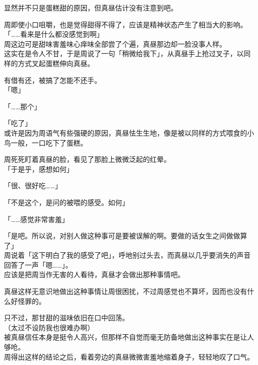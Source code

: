 显然并不只是蛋糕甜的原因，但真昼估计没有注意到吧。

周即使小口咀嚼，也是觉得甜得不得了，应该是精神状态产生了相当大的影响。\\

「……看来是什么都没感觉到啊」\\

周这边可是甜味害羞味心痒味全部尝了个遍，真昼那边却一脸没事人样。\\

这实在是令人不甘，于是周说了一句「稍微给我下」，从真昼手上抢过叉子，以同样的方式叉起蛋糕伸向真昼。

有借有还，被搞了怎能不还手。\\

「嗯」

「……那个」

「吃了」\\

或许是因为周语气有些强硬的原因，真昼怯生生地，像是被以同样的方式喂食的小鸟一般，一口吃下了蛋糕。

周死死盯着真昼的脸，看见了那脸上微微泛起的红晕。\\

「于是乎，感想如何」

「很、很好吃……」

「不是这个，是问的被喂的感受。如何」

「……感觉非常害羞」

「是吧。所以说，对别人做这种事可是要被误解的啊。要做的话女生之间做做算了」\\

周说着「这下明白了我的感受了吧」，呼地别过头去，而真昼以几乎要消失的声音回答了一声「嗯……」。\\

应该是把周当作无害的人看待，真昼才会做出那种事情吧。

真昼这样无意识地做出这种事情让周很困扰，不过周感觉也不算坏，因而也没有什么好怪罪的。

只不过，那甘甜的滋味依旧在口中回荡。\\

（太过不设防我也很难办啊）\\

被真昼信任本身是挺令人高兴，但那样不自觉而毫无防备地做出这种事实在是让人够呛。\\

周得出这样的结论之后，看着旁边的真昼微微害羞地缩着身子，轻轻地叹了口气。
